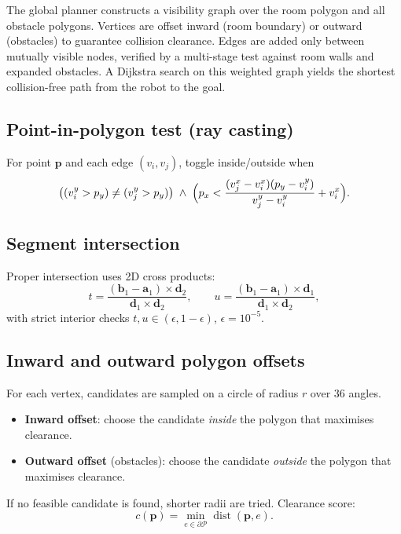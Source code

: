 \documentclass[a4paper, 11pt]{article}
\newcommand{\vect}[1]{\bm{#1}}
\begin{document}
The global planner constructs a visibility graph over the room polygon
and all obstacle polygons.  Vertices are offset inward (room boundary)
or outward (obstacles) to guarantee collision clearance.  Edges are
added only between mutually visible nodes, verified by a multi-stage
test against room walls and expanded obstacles.  A Dijkstra search on
this weighted graph yields the shortest collision-free path from the
robot to the goal.

\subsection{Point-in-polygon test (ray casting)}

For point $\vect{p}$ and each edge $(v_i, v_j)$, toggle inside/outside
when
\begin{equation}
  \bigl((v_i^y > p_y) \ne (v_j^y > p_y)\bigr)
  \;\land\;
  \Bigl(p_x < \frac{(v_j^x - v_i^x)(p_y - v_i^y)}{v_j^y - v_i^y} + v_i^x\Bigr).
\end{equation}

\subsection{Segment intersection}

Proper intersection uses 2D cross products:
\begin{equation}
  t = \frac{(\vect{b}_1 - \vect{a}_1) \times \vect{d}_2}
           {\vect{d}_1 \times \vect{d}_2},
  \qquad
  u = \frac{(\vect{b}_1 - \vect{a}_1) \times \vect{d}_1}
           {\vect{d}_1 \times \vect{d}_2},
\end{equation}
with strict interior checks $t, u \in (\epsilon, 1-\epsilon)$,
$\epsilon = 10^{-5}$.

\subsection{Inward and outward polygon offsets}

For each vertex, candidates are sampled on a circle of radius $r$ over
$36$ angles.
\begin{itemize}
  \item \textbf{Inward offset}: choose the candidate \emph{inside} the
        polygon that maximises clearance.
  \item \textbf{Outward offset} (obstacles): choose the candidate
        \emph{outside} the polygon that maximises clearance.
\end{itemize}
If no feasible candidate is found, shorter radii are tried.
Clearance score:
\begin{equation}
  c(\vect{p})
  = \min_{e \in \partial\mathcal{P}}
    \operatorname{dist}(\vect{p}, e).
\end{equation}
\end{document}
